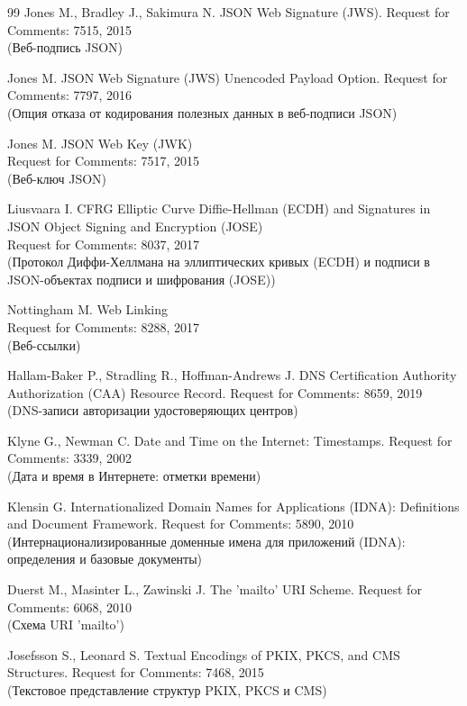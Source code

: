 \begin{thebibliography}{99}
Jones M., Bradley J., Sakimura N.
JSON Web Signature (JWS). 
Request for Comments: 7515, 2015\\
{\small (Веб-подпись JSON)}  

Jones M.
JSON Web Signature (JWS) Unencoded Payload Option.
Request for Comments: 7797, 2016\\
{\small (Опция отказа от кодирования полезных данных в веб-подписи JSON)}  

Jones M.
JSON Web Key (JWK)\\
Request for Comments: 7517, 2015\\ 
{\small (Веб-ключ JSON)} 

Liusvaara I.
CFRG Elliptic Curve Diffie-Hellman (ECDH) and Signatures in JSON Object Signing 
and Encryption (JOSE)\\
Request for Comments: 8037, 2017\\ 
{\small (Протокол Диффи-Хеллмана на эллиптических кривых (ECDH) 
и подписи в JSON-объектах подписи и шифрования (JOSE))} 

Nottingham M.
Web Linking\\
Request for Comments: 8288, 2017\\ 
{\small (Веб-ссылки)} 

Hallam-Baker P., Stradling R., Hoffman-Andrews J.
DNS Certification Authority Authorization (CAA) Resource Record.
Request for Comments: 8659, 2019\\
{\small (DNS-записи авторизации удостоверяющих центров)}  

Klyne G., Newman C.
Date and Time on the Internet: Timestamps.
Request for Comments: 3339, 2002\\
{\small (Дата и время в Интернете: отметки времени)}  

Klensin G.
Internationalized Domain Names for Applications (IDNA):
Definitions and Document Framework.
Request for Comments: 5890, 2010\\
{\small (Интернационализированные доменные имена для приложений (IDNA):
определения и базовые документы)}  

Duerst M., Masinter L., Zawinski J.
The 'mailto' URI Scheme.
Request for Comments: 6068, 2010\\
{\small (Схема URI 'mailto')}  

Josefsson S., Leonard S.
Textual Encodings of PKIX, PKCS, and CMS Structures.
Request for Comments: 7468, 2015\\
{\small (Текстовое представление структур PKIX, PKCS и CMS)}  


\end{thebibliography}
